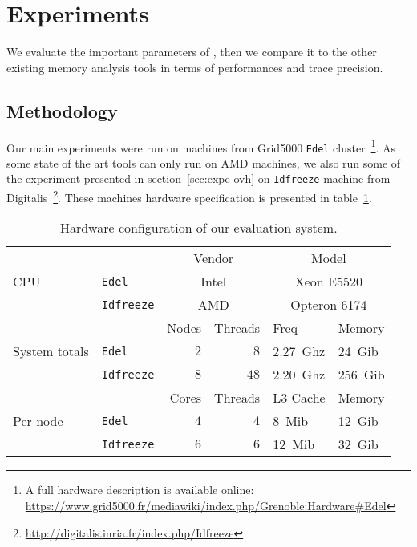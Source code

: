 \section{Experiments}
\label{sec:expe}

We evaluate the important parameters of \Moca, then we compare it to the other
existing memory analysis tools in terms of performances and trace precision.

\subsection{Methodology}
\label{sec:exp-methodo}


Our main experiments were run on  machines from Grid5000 \texttt{Edel}
cluster~\footnote{A full hardware description is available online:\\
    \url{https://www.grid5000.fr/mediawiki/index.php/Grenoble:Hardware\#Edel}}.
    As some state of the art tools can only run on AMD machines, we also run
    some of the experiment presented in section~\ref{sec:expe-ovh} on
    \texttt{Idfreeze} machine from
    Digitalis~\footnote{\url{http://digitalis.inria.fr/index.php/Idfreeze}}.
    These machines hardware specification is presented in table~\ref{tab:hw}.

\begin{table}[htb]
    \centering
    \begin{tabular}{lp{1.1cm}rrp{1.35cm}p{1.1cm}}
        \toprule
        \multirow{3}{.8cm}{CPU}
        &  & \multicolumn{2}{c}{Vendor} & \multicolumn{2}{c}{Model} \\
        \cmidrule(lr){3-6}
        & \texttt{Edel}  & \multicolumn{2}{c}{Intel} & \multicolumn{2}{c}{Xeon E5520} \\
        & \texttt{Idfreeze} & \multicolumn{2}{c}{AMD} & \multicolumn{2}{c}{Opteron 6174} \\
        \midrule
        \midrule
        \multirow{3}{.8cm}{System totals}
        & & Nodes & Threads & Freq & Memory \\
        \cmidrule(lr){3-6}
        & \texttt{Edel}   & $2$ & $8$ & \SI{2.27}{Ghz} & \SI{24}{Gib} \\
        & \texttt{Idfreeze} & $8$ & $48$ & \SI{2.20}{Ghz} & \SI{256}{Gib}\\
        \midrule
        \midrule
        \multirow{3}{.8cm}{Per node}
        & & Cores & Threads & L3 Cache & Memory \\
        \cmidrule(lr){3-6}
        & \texttt{Edel}   & $4$ & $4$ & \SI{8}{Mib} & \SI{12}{Gib} \\
        & \texttt{Idfreeze} & $6$ & $6$  & \SI{12}{Mib} & \SI{32}{Gib} \\
        \bottomrule
    \end{tabular}
    \caption{Hardware configuration of our evaluation system.}
    \label{tab:hw}
\end{table}

